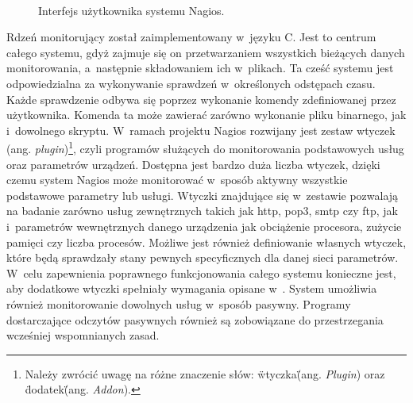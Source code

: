 \begin{figure}[h]
\label{fig:NagiosInterface}
\caption{Interfejs użytkownika systemu Nagios.}
\begin{center}
\\[0.1cm]
\end{center}
\end{figure}

Rdzeń monitorujący został zaimplementowany w~języku C. Jest to centrum
całego systemu, gdyż zajmuje się on przetwarzaniem wszystkich
bieżących danych monitorowania, a~następnie składowaniem ich
w~plikach. Ta cześć systemu jest odpowiedzialna za wykonywanie
sprawdzeń w~określonych odstępach czasu. Każde sprawdzenie odbywa się
poprzez wykonanie komendy zdefiniowanej przez użytkownika. Komenda ta
może zawierać zarówno wykonanie pliku binarnego, jak i~dowolnego
skryptu. W~ramach projektu Nagios rozwijany jest zestaw wtyczek
(ang. {\em plugin})\footnote{Należy zwrócić uwagę na różne znaczenie
  słów: \"wtyczka\" (ang. {\em Plugin}) oraz \"dodatek\" (ang. {\em Addon}). },
czyli programów służących do monitorowania podstawowych usług oraz
parametrów urządzeń. Dostępna jest bardzo duża liczba
wtyczek\cite{www:NagiosPluginProject}, dzięki czemu system Nagios może
monitorować w~sposób aktywny wszystkie podstawowe parametry lub
usługi. Wtyczki znajdujące się w~zestawie pozwalają na badanie zarówno
usług zewnętrznych takich jak http, pop3, smtp czy ftp, jak
i~parametrów wewnętrznych danego urządzenia jak obciążenie procesora,
zużycie pamięci czy liczba procesów. Możliwe jest również definiowanie
własnych wtyczek, które będą sprawdzały stany pewnych specyficznych
dla danej sieci parametrów. W~celu zapewnienia poprawnego
funkcjonowania całego systemu konieczne jest, aby dodatkowe wtyczki
spełniały wymagania opisane w~\cite{www:NagiosPluginsTutorial}. System
umożliwia również monitorowanie dowolnych usług w~sposób
pasywny. Programy dostarczające odczytów pasywnych również są
zobowiązane do przestrzegania wcześniej wspomnianych zasad.

